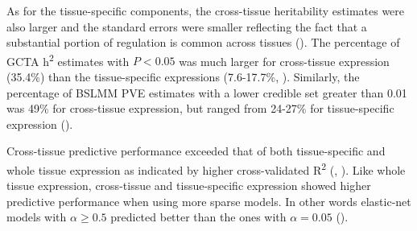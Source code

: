 \documentclass[10pt,letterpaper]{article}
\begin{document}
As for the tissue-specific components, 
the cross-tissue heritability estimates were also larger and the standard errors were smaller reflecting the fact that a substantial portion of regulation is common across tissues (). The percentage of GCTA h\textsuperscript{2} estimates with $P < 0.05$ was much larger for cross-tissue expression (35.4\%) than the tissue-specific expressions (7.6-17.7\%, ). Similarly, the percentage of BSLMM PVE estimates with a lower credible set greater than 0.01 was 49\% for cross-tissue expression, but ranged from 24-27\% for tissue-specific expression ().


Cross-tissue predictive performance exceeded that of both tissue-specific and whole tissue expression as indicated by higher cross-validated R\textsuperscript{2} (, ). Like whole tissue expression, cross-tissue and tissue-specific expression showed higher predictive performance when using more sparse models. In other words elastic-net models with \(\alpha \geq 0.5\) predicted better than the ones with \(\alpha=0.05\) (). 


\end{document}
